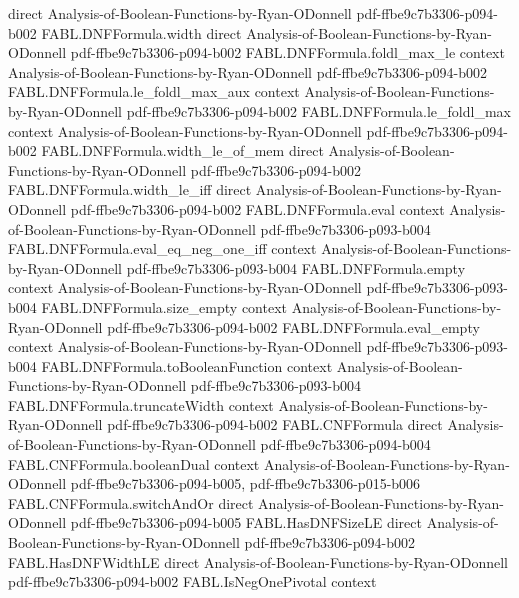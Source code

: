 \begin{theorem}
  {direct}
  {Analysis-of-Boolean-Functions-by-Ryan-ODonnell}
  {pdf-ffbe9c7b3306-p094-b002}
\proofstep
  {FABL.DNFFormula.width}
  {direct}
  {Analysis-of-Boolean-Functions-by-Ryan-ODonnell}
  {pdf-ffbe9c7b3306-p094-b002}
\proofstep
  {FABL.DNFFormula.foldl_max_le}
  {context}
  {Analysis-of-Boolean-Functions-by-Ryan-ODonnell}
  {pdf-ffbe9c7b3306-p094-b002}
\proofstep
  {FABL.DNFFormula.le_foldl_max_aux}
  {context}
  {Analysis-of-Boolean-Functions-by-Ryan-ODonnell}
  {pdf-ffbe9c7b3306-p094-b002}
\proofstep
  {FABL.DNFFormula.le_foldl_max}
  {context}
  {Analysis-of-Boolean-Functions-by-Ryan-ODonnell}
  {pdf-ffbe9c7b3306-p094-b002}
\proofstep
  {FABL.DNFFormula.width_le_of_mem}
  {direct}
  {Analysis-of-Boolean-Functions-by-Ryan-ODonnell}
  {pdf-ffbe9c7b3306-p094-b002}
\proofstep
  {FABL.DNFFormula.width_le_iff}
  {direct}
  {Analysis-of-Boolean-Functions-by-Ryan-ODonnell}
  {pdf-ffbe9c7b3306-p094-b002}
\proofstep
  {FABL.DNFFormula.eval}
  {context}
  {Analysis-of-Boolean-Functions-by-Ryan-ODonnell}
  {pdf-ffbe9c7b3306-p093-b004}
\proofstep
  {FABL.DNFFormula.eval_eq_neg_one_iff}
  {context}
  {Analysis-of-Boolean-Functions-by-Ryan-ODonnell}
  {pdf-ffbe9c7b3306-p093-b004}
\proofstep
  {FABL.DNFFormula.empty}
  {context}
  {Analysis-of-Boolean-Functions-by-Ryan-ODonnell}
  {pdf-ffbe9c7b3306-p093-b004}
\proofstep
  {FABL.DNFFormula.size_empty}
  {context}
  {Analysis-of-Boolean-Functions-by-Ryan-ODonnell}
  {pdf-ffbe9c7b3306-p094-b002}
\proofstep
  {FABL.DNFFormula.eval_empty}
  {context}
  {Analysis-of-Boolean-Functions-by-Ryan-ODonnell}
  {pdf-ffbe9c7b3306-p093-b004}
\proofstep
  {FABL.DNFFormula.toBooleanFunction}
  {context}
  {Analysis-of-Boolean-Functions-by-Ryan-ODonnell}
  {pdf-ffbe9c7b3306-p093-b004}
\proofstep
  {FABL.DNFFormula.truncateWidth}
  {context}
  {Analysis-of-Boolean-Functions-by-Ryan-ODonnell}
  {pdf-ffbe9c7b3306-p094-b002}
\proofstep
  {FABL.CNFFormula}
  {direct}
  {Analysis-of-Boolean-Functions-by-Ryan-ODonnell}
  {pdf-ffbe9c7b3306-p094-b004}
\proofstep
  {FABL.CNFFormula.booleanDual}
  {context}
  {Analysis-of-Boolean-Functions-by-Ryan-ODonnell}
  {pdf-ffbe9c7b3306-p094-b005,
    pdf-ffbe9c7b3306-p015-b006}
\proofstep
  {FABL.CNFFormula.switchAndOr}
  {direct}
  {Analysis-of-Boolean-Functions-by-Ryan-ODonnell}
  {pdf-ffbe9c7b3306-p094-b005}
\proofstep
  {FABL.HasDNFSizeLE}
  {direct}
  {Analysis-of-Boolean-Functions-by-Ryan-ODonnell}
  {pdf-ffbe9c7b3306-p094-b002}
\proofstep
  {FABL.HasDNFWidthLE}
  {direct}
  {Analysis-of-Boolean-Functions-by-Ryan-ODonnell}
  {pdf-ffbe9c7b3306-p094-b002}
\proofstep
  {FABL.IsNegOnePivotal}
  {context}

\end{theorem}
